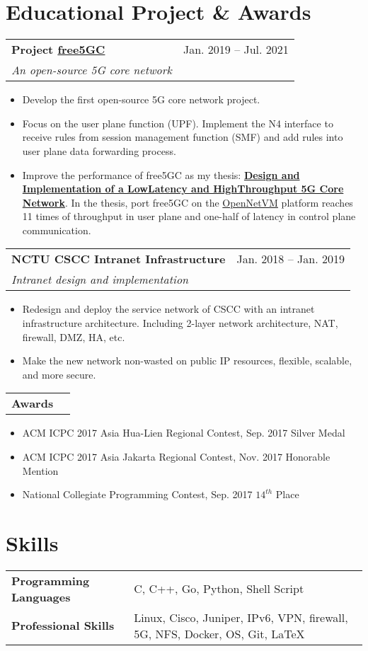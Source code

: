 \documentclass[letterpaper,11pt]{article}
\makeatletter
\newcommand{\resumeItemTwo}[1]{
  \item\small{
    {#1 \vspace{-2pt}}
  }
}
\newcommand{\resumeSubheading}[4]{
  \vspace{1pt}%
    \begin{tabular*}{0.97\textwidth}{l@{\extracolsep{\fill}}r}
      \textbf{#1} & #2 \\
      \textit{\small#3} & \textit{\small #4} \\
    \end{tabular*}\vspace{-5pt}
}
\newcommand{\resumeSubheadingOne}[2]{
  \vspace{-1pt}%
    \begin{tabular*}{0.97\textwidth}{l@{\extracolsep{\fill}}r}
      \textbf{#1} & #2 \\
    \end{tabular*}\vspace{-5pt}
}
\newcommand{\resumeSubHeadingListStart}{}%
\newcommand{\resumeSubHeadingListEnd}{}%
\newcommand{\resumeItemListStart}{\begin{itemize}}
\newcommand{\resumeItemListEnd}{\end{itemize}\vspace{-5pt}}
\makeatother
\begin{document}
\section{Educational Project \& Awards}
  \resumeSubHeadingListStart
    \resumeSubheading
     {Project \href{https://www.free5gc.org/}{free5GC}}{Jan. 2019 -- Jul. 2021}
      {An open-source 5G core network}{}
      \resumeItemListStart
        \resumeItemTwo{Develop the first open-source 5G core network project.}
        \resumeItemTwo{Focus on the user plane function (UPF). Implement the N4 interface to receive rules from session management function (SMF) and add rules into user plane data forwarding process.}
        \resumeItemTwo{Improve the performance of free5GC as my thesis: \textbf{\href{https://hdl.handle.net/11296/44vnys}{Design and Implementation of a Low­Latency and High­Throughput 5G Core Network}}. In the thesis, port free5GC on the \href{http://sdnfv.github.io/onvm/}{OpenNetVM} platform reaches 11 times of throughput in user plane and one-half of latency in control plane communication.}
      \resumeItemListEnd
    \resumeSubheading
     {NCTU CSCC Intranet Infrastructure}{Jan. 2018 -- Jan. 2019}
      {Intranet design and implementation}{}
      \resumeItemListStart
        \resumeItemTwo{Redesign and deploy the service network of CSCC with an intranet infrastructure architecture. Including 2-layer network architecture, NAT, firewall, DMZ, HA, etc.}
        \resumeItemTwo{Make the new network non-wasted on public IP resources, flexible, scalable, and more secure.}
      \resumeItemListEnd
    \resumeSubheadingOne
     {Awards}{}
      \resumeItemListStart
        \resumeItemTwo{ACM ICPC 2017 Asia Hua-Lien Regional Contest, Sep. 2017}{Silver Medal}
        \resumeItemTwo{ACM ICPC 2017 Asia Jakarta Regional Contest, Nov. 2017}{Honorable Mention}
        \resumeItemTwo{National Collegiate Programming Contest, Sep. 2017}{$14^{th}$ Place}
      \resumeItemListEnd
  \resumeSubHeadingListEnd

\section{Skills}
    \begin{tabular}{ l l }
     \textbf{Programming Languages}\qquad \qquad & C, C++, Go, Python, Shell Script\\
     \textbf{Professional Skills} & Linux, Cisco, Juniper, IPv6, VPN, firewall, 5G, NFS, Docker, OS, Git, \LaTeX\\
     \end{tabular}
\end{document}
